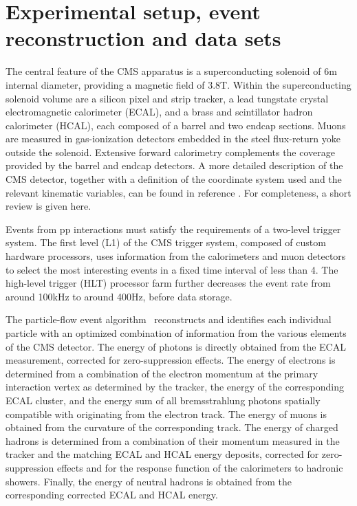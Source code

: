 \section{Experimental setup, event reconstruction and data sets}
\label{sect:CMSRec}
The central feature of the CMS apparatus is a superconducting solenoid of 6\unit{m} internal diameter, providing a magnetic field of 3.8\unit{T}. Within the superconducting solenoid volume are a silicon pixel and strip tracker, a lead tungstate crystal electromagnetic calorimeter (ECAL), and a brass and scintillator hadron calorimeter (HCAL), each composed of a barrel and two endcap sections. Muons are measured in gas-ionization detectors embedded in the steel flux-return yoke outside the solenoid. Extensive forward calorimetry complements the coverage provided by the barrel and endcap detectors. 
A more detailed description of the CMS detector, together with a definition of the coordinate system used and the relevant kinematic variables, can be found in reference \cite{Chatrchyan:2008zzk}.
For completeness, a short review is given here. 


Events from pp interactions must satisfy the requirements of a two-level trigger system.
The first level (L1) of the CMS trigger system, composed of custom hardware processors, uses information from the calorimeters and muon detectors to select the most interesting events in a fixed time interval of less than 4\mus. The high-level trigger (HLT) processor farm further decreases the event rate from around 100\unit{kHz} to around 400\unit{Hz}, before data storage. 

The particle-flow event algorithm~\cite{CMS-PAS-PFT-09-001,CMS-PAS-PFT-10-001} reconstructs and identifies each individual particle with an optimized combination of information from the various elements of the CMS detector. The energy of photons is directly obtained from the ECAL measurement, corrected for zero-suppression effects. The energy of electrons is determined from a combination of the electron momentum at the primary interaction vertex as determined by the tracker, the energy of the corresponding ECAL cluster, and the energy sum of all bremsstrahlung photons spatially compatible with originating from the electron track. The energy of muons is obtained from the curvature of the corresponding track. The energy of charged hadrons is determined from a combination of their momentum measured in the tracker and the matching ECAL and HCAL energy deposits, corrected for zero-suppression effects and for the response function of the calorimeters to hadronic showers. Finally, the energy of neutral hadrons is obtained from the corresponding corrected ECAL and HCAL energy. 

